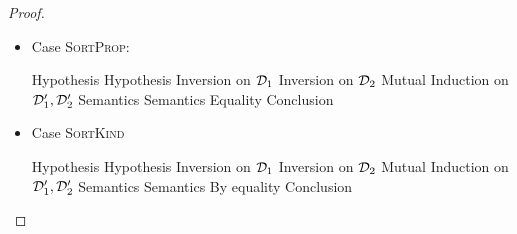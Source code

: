 \begin{proof}
\begin{enumerate}
\begin{itemize}
\item Case \textsc{SortProp}:
  \begin{eqnproof}
           {Hypothesis}
           {Hypothesis}
           {Inversion on $\mathcal{D}_1$}
           {Inversion on $\mathcal{D}_2$}
           {Mutual Induction on $\mathcal{D}'_1, \mathcal{D}'_2$}
           {Semantics}
           {Semantics}
           {Equality}
           {Conclusion}
  \end{eqnproof}

\item Case \textsc{SortKind}

  \begin{eqnproof}
           {Hypothesis}
           {Hypothesis}
           {Inversion on $\mathcal{D}_1$}
           {Inversion on $\mathcal{D}_2$}
           {Mutual Induction on $\mathcal{D}'_1, \mathcal{D}'_2$}
           {Semantics}
           {Semantics}
           {By equality}
           {Conclusion}
  \end{eqnproof}
\end{itemize}


\end{enumerate}
\end{proof}
